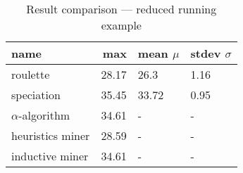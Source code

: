 \begin{table}
\centering
\caption{Result comparison --- reduced running example}
\begin{tabular}{lrll}
\toprule
             name &   max & mean $\mu$ & stdev $\sigma$ \\
\midrule
         roulette & 28.17 &      26.3 &          1.16 \\
       speciation & 35.45 &     33.72 &          0.95 \\
$\alpha$-algorithm & 34.61 &         - &             - \\
 heuristics miner & 28.59 &         - &             - \\
  inductive miner & 34.61 &         - &             - \\
\bottomrule
\end{tabular}
\end{table}
